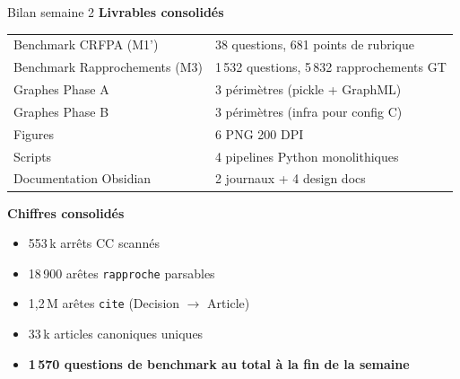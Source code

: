 \documentclass[aspectratio=169,10pt]{beamer}
\begin{document}
\begin{frame}{Bilan semaine 2}
  \textbf{Livrables consolidés}

  \footnotesize
  \begin{tabular}{@{}l l@{}}
    \toprule
    Benchmark CRFPA (M1')     & 38 questions, 681 points de rubrique \\
    Benchmark Rapprochements (M3) & 1\,532 questions, 5\,832 rapprochements GT \\
    Graphes Phase A           & 3 périmètres (pickle + GraphML) \\
    Graphes Phase B           & 3 périmètres (infra pour config C) \\
    Figures                   & 6 PNG 200 DPI \\
    Scripts                   & 4 pipelines Python monolithiques \\
    Documentation Obsidian    & 2 journaux + 4 design docs \\
    \bottomrule
  \end{tabular}

  \vspace{0.5em}
  \textbf{Chiffres consolidés}
  \begin{itemize}\footnotesize
    \item 553\,k arrêts CC scannés
    \item 18\,900 arêtes \texttt{rapproche} parsables
    \item 1{,}2\,M arêtes \texttt{cite} (Decision $\to$ Article)
    \item 33\,k articles canoniques uniques
    \item \textbf{1\,570 questions de benchmark au total à la fin de la semaine}
  \end{itemize}
\end{frame}
\end{document}
